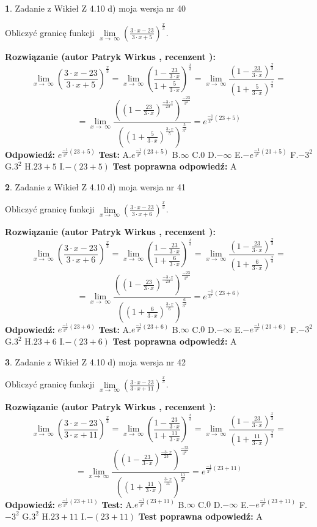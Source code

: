 \documentclass[12pt, a4paper]{article}
\theoremstyle{definition} %
\newtheorem{zad}{}
\newcommand{\zadStart}[1]{\begin{zad}#1\newline}
\newcommand{\zadStop}{\end{zad}}
\newcommand{\rozwStart}[2]{\noindent \textbf{Rozwiązanie (autor #1 , recenzent #2): }\newline}
\newcommand{\rozwStop}{\newline}
\newcommand{\odpStart}{\noindent \textbf{Odpowiedź:}\newline}
\newcommand{\odpStop}{\newline}
\newcommand{\testStart}{\noindent \textbf{Test:}\newline}
\newcommand{\testStop}{\newline}
\newcommand{\kluczStart}{\noindent \textbf{Test poprawna odpowiedź:}\newline}
\newcommand{\kluczStop}{\newline}
\begin{document}
\zadStart{Zadanie z Wikieł Z 4.10 d) moja wersja nr 40}


Obliczyć granicę funkcji  $\lim\limits_{x\to\ \infty}(\frac{3\cdot x-23}{3\cdot x+5})^{\frac{x}{3}}$.
\zadStop
\rozwStart{Patryk Wirkus}{}
$$\lim\limits_{x\to\ \infty}(\frac{3\cdot x-23}{3\cdot x+5})^{\frac{x}{3}} = \lim\limits_{x\to\ \infty}(\frac{1-\frac{23}{3\cdot x}}{1+\frac{5}{3\cdot x}})^{\frac{x}{3}}=\lim\limits_{x\to\ \infty}\frac{(1-\frac{23}{3\cdot x})^{\frac{x}{3}}}{(1+\frac{5}{3\cdot x})^{\frac{x}{3}}}=$$
$$=\lim\limits_{x\to\ \infty}\frac{((1-\frac{23}{3\cdot x})^{\frac{-3\cdot x}{23}})^{\frac{-23}{3^{2}}}}{((1+\frac{5}{3\cdot x})^{\frac{3\cdot x}{5}})^{\frac{5}{3^{2}}}}=e^{\frac{-1}{3^{2}}(23+5)}$$
\rozwStop
\odpStart
$e^{\frac{-1}{3^{2}}(23+5)}$
\odpStop
\testStart
A.$e^{\frac{-1}{3^{2}}(23+5)}$ B.$\infty$ C.$0$ D.$-\infty$ E.$-e^{\frac{-1}{3^{2}}(23+5)}$
F.$-3^{2}$ G.$3^{2}$
H.$23+5$
I.$-(23+5)$
\testStop
\kluczStart
A
\kluczStop



\zadStart{Zadanie z Wikieł Z 4.10 d) moja wersja nr 41}


Obliczyć granicę funkcji  $\lim\limits_{x\to\ \infty}(\frac{3\cdot x-23}{3\cdot x+6})^{\frac{x}{3}}$.
\zadStop
\rozwStart{Patryk Wirkus}{}
$$\lim\limits_{x\to\ \infty}(\frac{3\cdot x-23}{3\cdot x+6})^{\frac{x}{3}} = \lim\limits_{x\to\ \infty}(\frac{1-\frac{23}{3\cdot x}}{1+\frac{6}{3\cdot x}})^{\frac{x}{3}}=\lim\limits_{x\to\ \infty}\frac{(1-\frac{23}{3\cdot x})^{\frac{x}{3}}}{(1+\frac{6}{3\cdot x})^{\frac{x}{3}}}=$$
$$=\lim\limits_{x\to\ \infty}\frac{((1-\frac{23}{3\cdot x})^{\frac{-3\cdot x}{23}})^{\frac{-23}{3^{2}}}}{((1+\frac{6}{3\cdot x})^{\frac{3\cdot x}{6}})^{\frac{6}{3^{2}}}}=e^{\frac{-1}{3^{2}}(23+6)}$$
\rozwStop
\odpStart
$e^{\frac{-1}{3^{2}}(23+6)}$
\odpStop
\testStart
A.$e^{\frac{-1}{3^{2}}(23+6)}$ B.$\infty$ C.$0$ D.$-\infty$ E.$-e^{\frac{-1}{3^{2}}(23+6)}$
F.$-3^{2}$ G.$3^{2}$
H.$23+6$
I.$-(23+6)$
\testStop
\kluczStart
A
\kluczStop



\zadStart{Zadanie z Wikieł Z 4.10 d) moja wersja nr 42}


Obliczyć granicę funkcji  $\lim\limits_{x\to\ \infty}(\frac{3\cdot x-23}{3\cdot x+11})^{\frac{x}{3}}$.
\zadStop
\rozwStart{Patryk Wirkus}{}
$$\lim\limits_{x\to\ \infty}(\frac{3\cdot x-23}{3\cdot x+11})^{\frac{x}{3}} = \lim\limits_{x\to\ \infty}(\frac{1-\frac{23}{3\cdot x}}{1+\frac{11}{3\cdot x}})^{\frac{x}{3}}=\lim\limits_{x\to\ \infty}\frac{(1-\frac{23}{3\cdot x})^{\frac{x}{3}}}{(1+\frac{11}{3\cdot x})^{\frac{x}{3}}}=$$
$$=\lim\limits_{x\to\ \infty}\frac{((1-\frac{23}{3\cdot x})^{\frac{-3\cdot x}{23}})^{\frac{-23}{3^{2}}}}{((1+\frac{11}{3\cdot x})^{\frac{3\cdot x}{11}})^{\frac{11}{3^{2}}}}=e^{\frac{-1}{3^{2}}(23+11)}$$
\rozwStop
\odpStart
$e^{\frac{-1}{3^{2}}(23+11)}$
\odpStop
\testStart
A.$e^{\frac{-1}{3^{2}}(23+11)}$ B.$\infty$ C.$0$ D.$-\infty$ E.$-e^{\frac{-1}{3^{2}}(23+11)}$
F.$-3^{2}$ G.$3^{2}$
H.$23+11$
I.$-(23+11)$
\testStop
\kluczStart
A
\kluczStop
\end{document}
